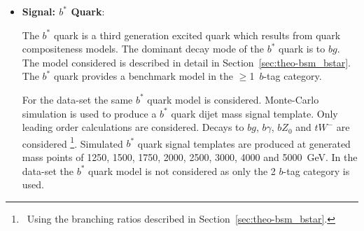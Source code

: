 \begin{itemize}[leftmargin=*]
  Further to this, for the \lm{} data-set
  the Dark Matter inspired (DM) $Z'$ boson is also considered.
  For this model the DM $Z'$ boson signal generation is performed at next-to-leading order using the \textsc{MadGraph5\_aMC@NLO} generator~\cite{dibjet-madGraph_NLO},
  whilst all other aspects of event modelling, including parton shower and hadronisation, are performed using the configuration with \textsc{Pythia8} as described above.
  The coupling of the DM $Z'$ boson to the dark matter fermion ($g_{\chi}$) is set to 1 and
  the mass of the dark matter fermion ($m_{\chi}$) is set to 10 TeV,
  the large value of $m_\chi$ means that decays of the $Z'$ boson to the dark matter fermion are suppressed.
  The coupling to quarks ($g_{SM}$) is set to 0.1,
  decays to $b$, $c$ and light flavour quarks are considered,
  and the generated mass points are 600, 800 and 1000~GeV.
  This configuration is chosen to be consistent with recommendations in~\cite{theo_bsm-zprime_dm}
  and to be consistent with other dijet searches at ATLAS~\cite{dijet-mori16_paper}.  \vspace{1em}

\item\textbf{Signal: $b^*$ Quark}:   

  \vspace{0.5em} 
  The $b^*$ quark is a third generation excited quark which results from
  quark compositeness models.
  The dominant decay mode of the  $b^*$ quark is to $bg$.
  The model considered is
  described in detail in Section~\ref{sec:theo-bsm_bstar}.
  The $b^*$ quark provides a benchmark model in the $\geq$1~$b$-tag category.  \vspace{1em}
  
  For the \summer{} data-set the same $b^*$ quark model is considered.
  Monte-Carlo simulation is used to produce a $b^*$ quark dijet mass signal template.
  Only leading order calculations are considered.
  Decays to $bg$, $b\gamma$, $bZ_0$ and $tW^{-}$ are considered
  \footnote{\ Using the branching ratios described in Section~\ref{sec:theo-bsm_bstar}.}.
  Simulated $b^*$ quark signal templates are produced at generated mass points of
  1250, 1500, 1750, 2000, 2500, 3000, 4000 and 5000~GeV.
  In the \lm{} data-set the $b^*$ quark model is not considered 
  as only the 2 $b$-tag category is used.
\end{itemize}


